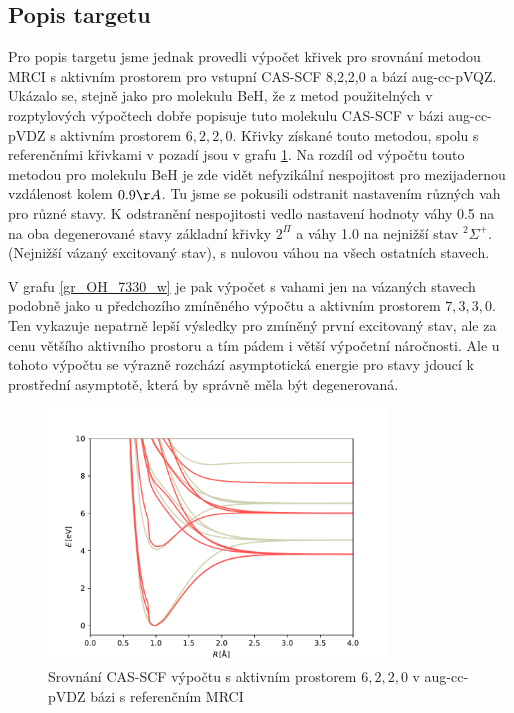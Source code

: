 \subsection{Popis targetu}

Pro popis targetu jsme jednak provedli výpočet křivek pro srovnání metodou MRCI s 
aktivním prostorem pro vstupní CAS-SCF 8,2,2,0 a bází aug-cc-pVQZ. Ukázalo se, stejně 
jako pro molekulu BeH, že z metod použitelných v rozptylových výpočtech dobře popisuje 
tuto molekulu CAS-SCF v bázi aug-cc-pVDZ s aktivním prostorem $6,2,2,0$. Křivky  
získané touto metodou, spolu s referenčními křivkami v pozadí jsou v grafu 
\ref{gr_OH_6220}. Na rozdíl od výpočtu touto metodou pro molekulu BeH je zde vidět 
nefyzikální nespojitost pro mezijadernou vzdálenost kolem $0.9\AA$. Tu jsme se 
pokusili odstranit nastavením různých vah pro různé stavy. K odstranění nespojitosti 
vedlo nastavení hodnoty váhy 0.5 na na oba degenerované stavy základní křivky $2^\Pi$ 
a váhy 1.0 na nejnižší stav  $^2\Sigma^+$. (Nejnižší vázaný excitovaný stav), s 
nulovou váhou na všech ostatních stavech.

V grafu \ref{gr_OH_7330_w} je pak výpočet s vahami jen na vázaných stavech podobně 
jako u předchozího zmíněného výpočtu a aktivním prostorem $7,3,3,0$. Ten vykazuje 
nepatrně lepší výsledky pro zmíněný první excitovaný stav, ale za cenu většího 
aktivního prostoru a tím pádem i větší výpočetní náročnosti. Ale u tohoto výpočtu se 
výrazně rozchází asymptotická energie pro stavy jdoucí k prostřední asymptotě, která 
by správně měla být degenerovaná.

\begin{figure}
\centering
\includegraphics[width=0.8\textwidth]{../img/OH-MULTI-DZ-6220.pdf}
\caption{Srovnání CAS-SCF výpočtu s aktivním prostorem $6,2,2,0$ v aug-cc-pVDZ bázi 
s referenčním MRCI}
\label{gr_OH_6220}
\end{figure}

